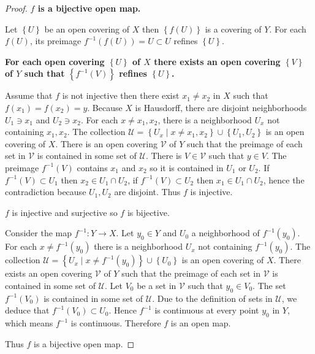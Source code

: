 \begin{proof}
	\textbf{\( f \) is a bijective open map.}

	Let \( \left\{ U \right\} \) be an open covering of \( X \) then \( \left\{ f(U) \right\} \) is a covering of \( Y \). For each \( f(U) \), its preimage \( f^{-1}(f(U)) = U \subset U \) refines \( \left\{ U \right\} \).

	\textbf{For each open covering \( \left\{ U \right\} \) of \( X \) there exists an open covering \( \left\{ V \right\} \) of \( Y \) such that \( \left\{ f^{-1}(V) \right\} \) refines \( \left\{ U \right\} \).}

	Assume that \( f \) is not injective then there exist \( x_{1} \ne x_{2} \) in \( X \) such that \( f(x_{1}) = f(x_{2}) = y \). Because \( X \) is Hausdorff, there are disjoint neighborhoods \( U_{1} \ni x_{1} \) and \( U_{2} \ni x_{2} \). For each \( x \ne x_{1}, x_{2} \), there is a neighborhood \( U_{x} \) not containing \( x_{1}, x_{2} \). The collection \( \mathcal{U} = \left\{ U_{x} \mid x \ne x_{1}, x_{2} \right\} \cup \left\{ U_{1}, U_{2} \right\} \) is an open covering of \( X \). There is an open covering \( \mathcal{V} \) of \( Y \) such that the preimage of each set in \( \mathcal{V} \) is contained in some set of \( \mathcal{U} \). There is \( V \in \mathcal{V} \) such that \( y \in V \). The preimage \( f^{-1}(V) \) contains \( x_{1} \) and \( x_{2} \) so it is contained in \( U_{1} \) or \( U_{2} \). If \( f^{-1}(V) \subset U_{1} \) then \( x_{2} \in U_{1} \cap U_{2} \), if \( f^{-1}(V) \subset U_{2} \) then \( x_{1} \in U_{1} \cap U_{2} \), hence the contradiction because \( U_{1}, U_{2} \) are disjoint. Thus \( f \) is injective.

	\( f \) is injective and surjective so \( f \) is bijective.

	Consider the map \( f^{-1}: Y \to X \). Let \( y_{0} \in Y \) and \( U_{0} \) a neighborhood of \( f^{-1}(y_{0}) \). For each \( x \ne f^{-1}(y_{0}) \) there is a neighborhood \( U_{x} \) not containing \( f^{-1}(y_{0}) \). The collection \( \mathcal{U} = \left\{ U_{x} \mid x \ne f^{-1}(y_{0}) \right\} \cup \left\{ U_{0} \right\} \) is an open covering of \( X \). There exists an open covering \( \mathcal{V} \) of \( Y \) such that the preimage of each set in \( \mathcal{V} \) is contained in some set of \( \mathcal{U} \). Let \( V_{0} \) be a set in \( \mathcal{V} \) such that \( y_{0} \in V_{0} \). The set \( f^{-1}(V_{0}) \) is contained in some set of \( \mathcal{U} \). Due to the definition of sets in \( \mathcal{U} \), we deduce that \( f^{-1}(V_{0}) \subset U_{0} \). Hence \( f^{-1} \) is continuous at every point \( y_{0} \) in \( Y \), which means \( f^{-1} \) is continuous. Therefore \( f \) is an open map.

	Thus \( f \) is a bijective open map.
\end{proof}

